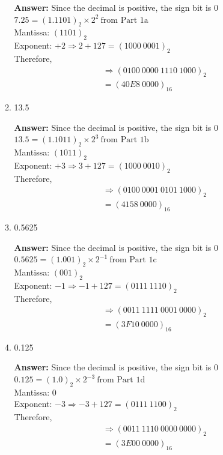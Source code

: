 \documentclass[12pt]{article}
\begin{document}
\begin{enumerate}
\begin{enumerate}
      \textbf{Answer:}
      Since the decimal is positive, the sign bit is 0 \\
      $7.25 = (1.1101)_2 \times 2^{2} \ \text{from Part 1a}$ \\
      Mantissa: $(1101)_2$ \\
      Exponent: $+2 \Rightarrow 2 + 127 = (1000 \ 0001)_2$ \\
      Therefore,
      \begin{align*}
        &\Rightarrow (0100 \ 0000 \ 1110 \ 1000)_2 \\
        &= (40E8 \ 0000)_{16}
      \end{align*}

      \item 13.5

      \textbf{Answer:}
      Since the decimal is positive, the sign bit is 0 \\
      $13.5 = (1.1011)_2 \times 2^{3} \ \text{from Part 1b}$ \\
      Mantissa: $(1011)_2$ \\
      Exponent: $+3 \Rightarrow 3 + 127 = (1000 \ 0010)_2$ \\
      Therefore,
      \begin{align*}
        &\Rightarrow (0100 \ 0001 \ 0101 \ 1000)_2 \\
        &= (4158 \ 0000)_{16}
      \end{align*}

      \item 0.5625

      \textbf{Answer:}
      Since the decimal is positive, the sign bit is 0 \\
      $0.5625 = (1.001)_2 \times 2^{-1} \ \text{from Part 1c}$ \\
      Mantissa: $(001)_2$ \\
      Exponent: $-1 \Rightarrow -1 + 127 = (0111 \ 1110)_2$ \\
      Therefore,
      \begin{align*}
        &\Rightarrow (0011 \ 1111 \ 0001 \ 0000)_2 \\
        &= (3F10 \ 0000)_{16}
      \end{align*}

      \item 0.125

      \textbf{Answer:}
      Since the decimal is positive, the sign bit is 0 \\
      $0.125 = (1.0)_2 \times 2^{-3} \ \text{from Part 1d}$ \\
      Mantissa: 0 \\
      Exponent: $-3 \Rightarrow -3 + 127 = (0111 \ 1100)_2$ \\
      Therefore,
      \begin{align*}
        &\Rightarrow (0011 \ 1110 \ 0000 \ 0000)_2 \\
        &= (3E00 \ 0000)_{16}
      \end{align*}


\end{enumerate}
\end{enumerate}
\end{document}
